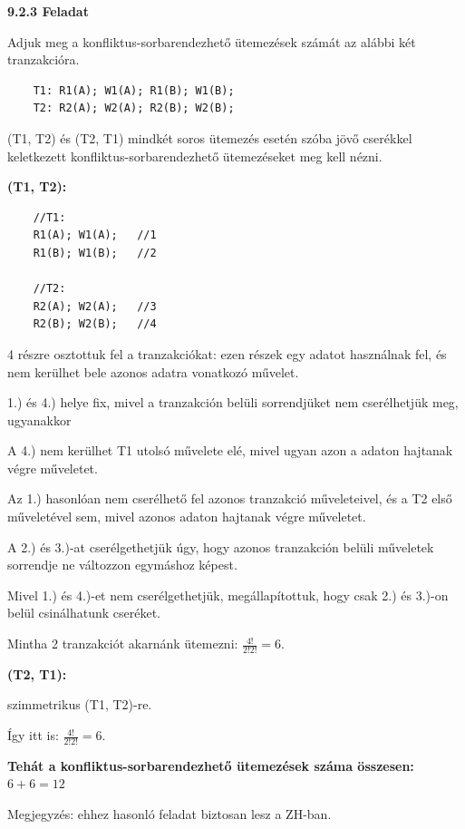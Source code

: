 \documentclass[a4paper,11.5pt, table]{article}
\begin{document}
	\textbf{9.2.3 Feladat}
	
	Adjuk meg a konfliktus-sorbarendezhető ütemezések számát az alábbi két tranzakcióra.
	\begin{lstlisting}
	T1: R1(A); W1(A); R1(B); W1(B);
	T2: R2(A); W2(A); R2(B); W2(B);
	\end{lstlisting}
	
	\begin{itemize}
		\item (T1, T2) és (T2, T1) mindkét soros ütemezés esetén szóba jövő cserékkel keletkezett konfliktus-sorbarendezhető ütemezéseket meg kell nézni.
		\item \textbf{(T1, T2):}
		\begin{lstlisting}
	//T1:
	R1(A); W1(A);	//1
	R1(B); W1(B);	//2
	
	//T2:
	R2(A); W2(A);	//3
	R2(B); W2(B);	//4
		\end{lstlisting}
		
			\item A 2.) és 3.)-at cserélgethetjük úgy, hogy azonos tranzakción belüli műveletek sorrendje ne változzon egymáshoz képest.
		\end{compactitem}
		
		\item \textbf{(T2, T1):}
		\begin{compactitem}
			\item szimmetrikus (T1, T2)-re.
			\item Így itt is: \Large \textbf{$\frac{4!}{2! 2!} = 6$}.
		\end{compactitem}
	
		\item \textbf{Tehát a konfliktus-sorbarendezhető ütemezések száma összesen:} {\Large $6+6 = 12$}
		\item Megjegyzés: ehhez hasonló feladat biztosan lesz a ZH-ban.
	\end{itemize}
\end{document}
